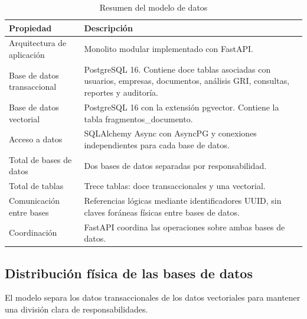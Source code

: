 \setcounter{table}{0}
\begin{table}[H]
\centering
\caption{Resumen del modelo de datos}
\label{tab:resumen-modelo-datos}
\renewcommand{\arraystretch}{1.3}
\begin{tabularx}{\textwidth}{
    >{\raggedright\arraybackslash}p{4cm}
    >{\raggedright\arraybackslash}X
}
\toprule
\textbf{Propiedad} & \textbf{Descripción} \\
\midrule

Arquitectura de aplicación
&
Monolito modular implementado con FastAPI.
\\

Base de datos transaccional
&
PostgreSQL 16. Contiene doce tablas asociadas con usuarios, empresas,
documentos, análisis GRI, consultas, reportes y auditoría.
\\

Base de datos vectorial
&
PostgreSQL 16 con la extensión pgvector. Contiene la tabla
fragmentos\_documento.
\\

Acceso a datos
&
SQLAlchemy Async con AsyncPG y conexiones independientes para cada
base de datos.
\\

Total de bases de datos
&
Dos bases de datos separadas por responsabilidad.
\\

Total de tablas
&
Trece tablas: doce transaccionales y una vectorial.
\\

Comunicación entre bases
&
Referencias lógicas mediante identificadores UUID, sin claves foráneas
físicas entre bases de datos.
\\

Coordinación
&
FastAPI coordina las operaciones sobre ambas bases de datos.
\\

\bottomrule
\end{tabularx}
\end{table}



\subsection{Distribución física de las bases de datos}

El modelo separa los datos transaccionales de los datos vectoriales para
mantener una división clara de responsabilidades.


